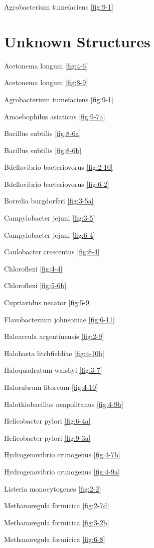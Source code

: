 \documentclass[]{tufte-book}
\begin{document}
Agrobacterium tumefaciens \ref{fig:9-1}

\hypertarget{unknown-structures}{%
\section*{Unknown Structures}\label{unknown-structures}}

Acetonema longum \ref{fig:4-6}

Acetonema longum \ref{fig:8-9}

Agrobacterium tumefaciens \ref{fig:9-1}

Amoebophilus asiaticus \ref{fig:9-7a}

Bacillus subtilis \ref{fig:8-6a}

Bacillus subtilis \ref{fig:8-6b}

Bdellovibrio bacteriovorus \ref{fig:2-10}

Bdellovibrio bacteriovorus \ref{fig:6-2}

Borrelia burgdorferi \ref{fig:3-5a}

Campylobacter jejuni \ref{fig:3-5}

Campylobacter jejuni \ref{fig:6-4}

Caulobacter crescentus \ref{fig:8-4}

Chloroflexi \ref{fig:4-4}

Chloroflexi \ref{fig:5-6b}

Cupriavidus necator \ref{fig:5-9}

Flavobacterium johnsoniae \ref{fig:6-11}

Haloarcula argentinensis \ref{fig:2-9}

Halohasta litchfieldiae \ref{fig:4-10b}

Haloquadratum walsbyi \ref{fig:3-7}

Halorubrum litoreum \ref{fig:4-10}

Halothiobacillus neapolitanus \ref{fig:4-9b}

Helicobacter pylori \ref{fig:6-4a}

Helicobacter pylori \ref{fig:9-3a}

Hydrogenovibrio crunogenus \ref{fig:4-7b}

Hydrogenovibrio crunogenus \ref{fig:4-9a}

Listeria monocytogenes \ref{fig:2-2}

Methanoregula formicica \ref{fig:2-7d}

Methanoregula formicica \ref{fig:3-2b}

Methanoregula formicica \ref{fig:6-8}
\end{document}
